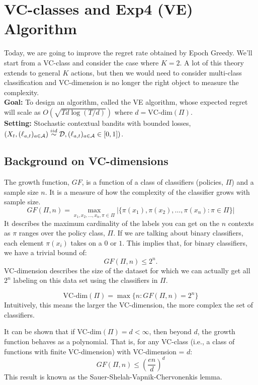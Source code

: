 \documentclass[11pt]{article}
\begin{document}
\section{VC-classes and Exp4 (VE) Algorithm \cite{beygelzimer2011contextual}}
Today, we are going to improve the regret rate obtained by Epoch Greedy. We'll start from a VC-class and consider the case where $K=2$. A lot of this theory extends to general $K$ actions, but then we would need to consider multi-class classification and VC-dimension is no longer the right object to measure the complexity. \hfill
\newline \\
\textbf{Goal:} To design an algorithm, called the VE algorithm, whose expected regret will scale as $O(\sqrt{Td\log(T/d)})$ where $d = \text{VC-dim}(\Pi)$. \hfill
\newline\\
\textbf{Setting:} Stochastic contextual bandits with bounded losses, $(X_t,(\ell_{a,t})_{a\in\mathcal{A}}) \stackrel{iid}\sim \mathcal{D}, (\ell_{a,t})_{a\in\mathcal{A}} \in [0,1] )$. 



\subsection{Background on VC-dimensions}
The growth function, $GF$, is a function of a class of classifiers (policies, $\Pi$) and a sample size $n$. It is a measure of how the complexity of the classifier grows with sample size.
\begin{equation}
GF(\Pi,n) = \max_{x_1,x_2,\ldots, x_n, \pi \in \Pi} | \{\pi(x_1),\pi(x_2),\ldots,\pi(x_n): \pi \in \Pi\}|
\end{equation}
It describes the maximum cardinality of the labels you can get on the $n$ contexts as $\pi$ ranges over the policy class, $\Pi$. If we are talking about binary classifiers, each element $\pi(x_i)$ takes on a $0$ or $1$. This implies that, for binary classifiers, we have a trivial bound of: 
$$
GF(\Pi,n) \le 2^n.
$$
VC-dimension describes the size of the dataset for which we can actually get all $2^n$ labeling on this data set using the classifiers in $\Pi$.

\begin{equation}
\text{VC-dim}(\Pi) = \max \{n: GF(\Pi,n) = 2^n\}
\end{equation}
Intuitively, this means the larger the VC-dimension, the more complex the set of classifiers. 

It can be shown that if VC-dim$(\Pi) = d < \infty$, then beyond $d$, the growth function behaves as a polynomial. That is, for any VC-class (i.e., a class of functions with finite VC-dimension) with VC-dimension = $d$:
\begin{equation}\label{eq: growth function bound}
GF(\Pi, n) \le \left(\frac{en}{d}\right)^d
\end{equation}
This result is known as the Sauer-Shelah-Vapnik-Chervonenkis lemma.
\end{document}
